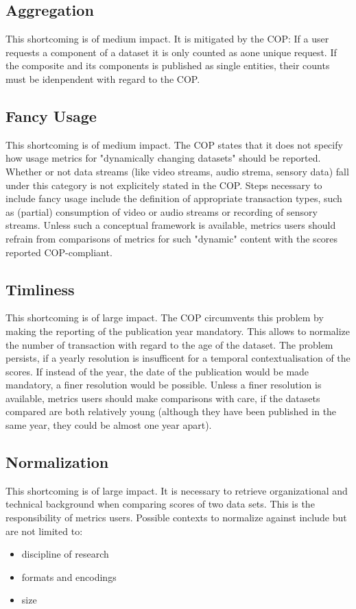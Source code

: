 \documentclass[conference, a4paper]{IEEEtran}\usepackage[]{graphicx}\usepackage[]{color}
\begin{document}
\subsection{Aggregation}
This shortcoming is of medium impact.
It is mitigated by the COP: If a user requests a component of a dataset
it is only counted as aone unique request.
If the composite and its components is published as single entities,
their counts must be idenpendent with regard to the COP.

\subsection{Fancy Usage}
This shortcoming is of medium impact.
The COP states that it does not specify how usage metrics for "dynamically changing datasets"
should be reported.
Whether or not data streams (like video streams, audio strema, sensory data)
fall under this category is not explicitely stated in the COP.
Steps necessary to include fancy usage include the definition of appropriate transaction types,
such as (partial) consumption of video or audio  streams or recording of sensory streams.
Unless such a conceptual framework is available,
metrics users should refrain from comparisons of metrics for such "dynamic" content
with the scores reported COP-compliant.

\subsection{Timliness}
This shortcoming is of large impact.
The COP circumvents this problem by
making the reporting of the publication year mandatory.
This allows to normalize the number of transaction with regard to the age of the dataset.
The problem persists, if a yearly resolution is insufficent for
a temporal contextualisation of the scores.
If instead of the year, the date of the publication would be made mandatory,
a finer resolution would be possible.
Unless a finer resolution is available,
metrics users should make comparisons with care, if the datasets compared are both
relatively young
(although they have been published in the same year, they could be almost one year apart).

\subsection{Normalization}
This shortcoming is of large impact.
It is necessary to retrieve organizational and technical background when comparing scores
of two data sets.
This is the responsibility of metrics users.
Possible contexts to normalize against include but are not limited to:
\begin{itemize}
        \item discipline of research
        \item formats and encodings
        \item size
\end{itemize}
\end{document}
